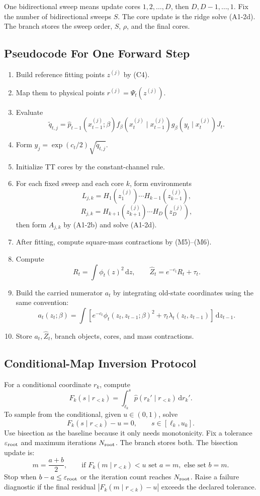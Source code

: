 \documentclass[11pt]{article}
\newcommand{\dd}{\,\mathrm d}
\begin{document}
One bidirectional sweep means update cores \(1,2,\ldots,D\), then
\(D,D-1,\ldots,1\).  Fix the number of bidirectional sweeps \(S\).  The core
update is the ridge solve (A1-2d).  The branch stores the sweep order, \(S\),
\(\rho\), and the final cores.

\subsection{Pseudocode For One Forward Step}

\begin{enumerate}[leftmargin=2em]
\item Build reference fitting points \(z^{(j)}\) by (C4).
\item Map them to physical points \(r^{(j)}=\Psi_t(z^{(j)})\).
\item Evaluate
\[
    \widetilde q_{t,j}
    =
    \widehat p_{t-1}(x_{t-1}^{(j)};\beta)
    f_\beta(x_t^{(j)}\mid x_{t-1}^{(j)})
    g_\beta(y_t\mid x_t^{(j)})J_t.
\]
\item Form \(y_j=\exp(c_t/2)\sqrt{\widetilde q_{t,j}}\).
\item Initialize TT cores by the constant-channel rule.
\item For each fixed sweep and each core \(k\), form environments
\[
    L_{j,k}=H_1(z_1^{(j)})\cdots H_{k-1}(z_{k-1}^{(j)}),
\]
\[
    R_{j,k}=H_{k+1}(z_{k+1}^{(j)})\cdots H_D(z_D^{(j)}),
\]
then form \(A_{j,k}\) by (A1-2b) and solve (A1-2d).
\item After fitting, compute square-mass contractions by (M5)--(M6).
\item Compute
\[
    R_t=\int\phi_t(z)^2\dd z,\qquad
    \widehat Z_t=e^{-c_t}R_t+\tau_t.
\]
\item Build the carried numerator \(a_t\) by integrating old-state coordinates
using the same convention:
\[
    a_t(z_t;\beta)
    =
    \int
    \left[e^{-c_t}\phi_t(z_t,z_{t-1};\beta)^2
    +\tau_t\lambda_t(z_t,z_{t-1})\right]\dd z_{t-1}.
\]
\item Store \(a_t,\widehat Z_t\), branch objects, cores, and mass contractions.
\end{enumerate}

\subsection{Conditional-Map Inversion Protocol}

For a conditional coordinate \(r_k\), compute
\[
    F_k(s\mid r_{<k})
    =
    \int_{\ell_k}^{s}\widehat p(r_k'\mid r_{<k})\dd r_k'.
\]
To sample from the conditional, given \(u\in(0,1)\), solve
\[
    F_k(s\mid r_{<k})-u=0,\qquad s\in[\ell_k,u_k].
\]
Use bisection as the baseline because it only needs monotonicity.  Fix a
tolerance \(\varepsilon_{\rm root}\) and maximum iterations \(N_{\rm root}\).
The branch stores both.  The bisection update is:
\[
    m=\frac{a+b}{2},\qquad
    \text{if }F_k(m\mid r_{<k})<u\text{ set }a=m,\text{ else set }b=m.
\]
Stop when \(b-a\le\varepsilon_{\rm root}\) or the iteration count reaches
\(N_{\rm root}\).  Raise a failure diagnostic if the final residual
\(|F_k(m\mid r_{<k})-u|\) exceeds the declared tolerance.
\end{document}
